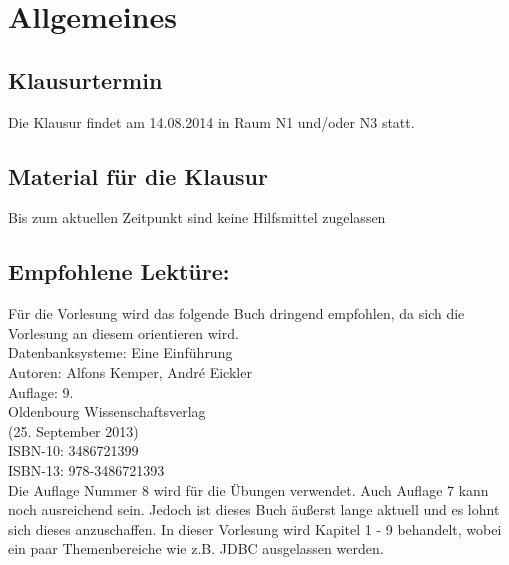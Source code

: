 \chapter{Allgemeines}
\section{Klausurtermin}
Die Klausur findet am 14.08.2014 in Raum N1 und/oder N3 statt.

\section{Material für die Klausur}
Bis zum aktuellen Zeitpunkt sind keine Hilfsmittel zugelassen
%
\section{Empfohlene Lektüre:}
Für die Vorlesung wird das folgende Buch dringend empfohlen, da sich die Vorlesung an diesem orientieren wird. \\
Datenbanksysteme: Eine Einführung\\
 Autoren: Alfons Kemper, André Eickler\\
 Auflage: 9.\\
 Oldenbourg Wissenschaftsverlag\\
(25. September 2013)\\
ISBN-10: 3486721399\\
ISBN-13: 978-3486721393\\

Die Auflage Nummer 8 wird für die Übungen verwendet. Auch Auflage 7 kann noch ausreichend sein. Jedoch ist dieses Buch äußerst lange aktuell und es lohnt sich dieses anzuschaffen. In dieser Vorlesung wird Kapitel 1 - 9 behandelt, wobei ein paar Themenbereiche wie z.B. JDBC ausgelassen werden. 

